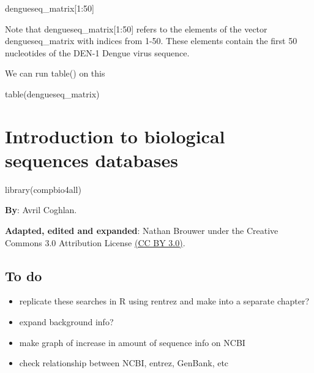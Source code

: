 \documentclass[
]{book}
\newenvironment{Shaded}{\begin{snugshade}}{\end{snugshade}}
\newcommand{\DecValTok}[1]{\textcolor[rgb]{0.00,0.00,0.81}{#1}}
\newcommand{\FunctionTok}[1]{\textcolor[rgb]{0.00,0.00,0.00}{#1}}
\newcommand{\NormalTok}[1]{#1}
\newcommand{\SpecialCharTok}[1]{\textcolor[rgb]{0.00,0.00,0.00}{#1}}
\providecommand{\tightlist}{%
  \setlength{\itemsep}{0pt}\setlength{\parskip}{0pt}}
\begin{document}
\begin{Shaded}
\begin{Highlighting}[]
\NormalTok{dengueseq\_matrix[}\DecValTok{1}\SpecialCharTok{:}\DecValTok{50}\NormalTok{]}
\end{Highlighting}
\end{Shaded}

Note that dengueseq\_matrix{[}1:50{]} refers to the elements of the vector dengueseq\_matrix with indices from 1-50. These elements contain the first 50 nucleotides of the DEN-1 Dengue virus sequence.

We can run table() on this

\begin{Shaded}
\begin{Highlighting}[]
\FunctionTok{table}\NormalTok{(dengueseq\_matrix)}
\end{Highlighting}
\end{Shaded}

\hypertarget{introduction-to-biological-sequences-databases}{%
\chapter{Introduction to biological sequences databases}\label{introduction-to-biological-sequences-databases}}

\begin{Shaded}
\begin{Highlighting}[]
\FunctionTok{library}\NormalTok{(compbio4all)}
\end{Highlighting}
\end{Shaded}

\textbf{By}: Avril Coghlan.

\textbf{Adapted, edited and expanded}: Nathan Brouwer under the Creative Commons 3.0 Attribution License \href{https://creativecommons.org/licenses/by/3.0/}{(CC BY 3.0)}.

\hypertarget{to-do}{%
\section{To do}\label{to-do}}

\begin{itemize}
\tightlist
\item
  replicate these searches in R using rentrez and make into a separate chapter?
\item
  expand background info?
\item
  make graph of increase in amount of sequence info on NCBI
\item
  check relationship between NCBI, entrez, GenBank, etc
\end{itemize}
\end{document}
